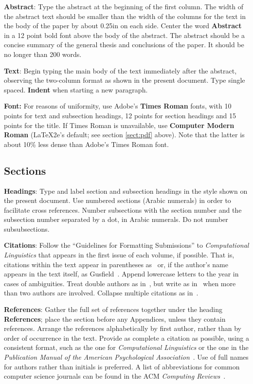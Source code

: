 \documentclass[10pt]{article}
\begin{document}
{\bf Abstract}: Type the abstract at the beginning of the first
column.  The width of the abstract text should be smaller than the
width of the columns for the text in the body of the paper by about
0.25in on each side.  Center the word {\bf Abstract} in a 12 point
bold font above the body of the abstract. The abstract should be a
concise summary of the general thesis and conclusions of the paper.
It should be no longer than 200 words.

{\bf Text}: Begin typing the main body of the text immediately after
the abstract, observing the two-column format as shown in 
the present document. Type single spaced. 
{\bf Indent} when starting a new paragraph. 

{\bf Font:} 
For reasons of uniformity,
use Adobe's {\bf Times Roman} fonts, with 10 points for text and 
subsection headings, 12 points for section headings and 15 points for
the title. If Times Roman is unavailable, use {\bf Computer Modern
  Roman} (\LaTeX2e{}'s default; see section \ref{sect:pdf} above).
Note that the latter is about 10\% less dense than Adobe's Times Roman
font.  

\subsection{Sections}

{\bf Headings}: Type and label section and subsection headings in the
style shown on the present document.  Use numbered sections (Arabic
numerals) in order to facilitate cross references. Number subsections
with the section number and the subsection number separated by a dot,
in Arabic numerals. Do not number subsubsections.

{\bf Citations}: Follow the ``Guidelines for Formatting Submissions''
to {\em Computational Linguistics\/} that appears in the first issue of
each volume, if possible.  That is, citations within the text appear
in parentheses as~\cite{Gusfield:97} or, if the author's name appears in
the text itself, as Gusfield~. 
Append lowercase letters to the year in cases of ambiguities.  
Treat double authors as in~\cite{Aho:72}, but write as 
in~\cite{Chandra:81} when more than two authors are involved. 
Collapse multiple citations as in~\cite{Gusfield:97,Aho:72}.

\textbf{References}: Gather the full set of references together under
the heading {\bf References}; place the section before any Appendices,
unless they contain references. Arrange the references alphabetically
by first author, rather than by order of occurrence in the text.
Provide as complete a citation as possible, using a consistent format,
such as the one for {\em Computational Linguistics\/} or the one in the 
{\em Publication Manual of the American 
Psychological Association\/}~\cite{APA:83}.  Use of full names for
authors rather than initials is preferred.  A list of abbreviations
for common computer science journals can be found in the ACM 
{\em Computing Reviews\/}~\cite{ACM:83}.
\end{document}
